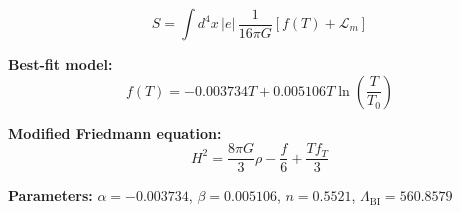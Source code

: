 
\begin{equation}
  S = \int d^4x \, |e| \, \frac{1}{16\pi G} \left[ f(T) + \mathcal{L}_m \right]
\end{equation}

\textbf{Best-fit model:}
\begin{equation}
  f(T) = -0.003734 T + 0.005106 T \ln\!\left(\frac{T}{T_0}\right)
\end{equation}

\textbf{Modified Friedmann equation:}
\begin{equation}
  H^2 = \frac{8\pi G}{3} \rho - \frac{f}{6} + \frac{T f_T}{3}
\end{equation}

\textbf{Parameters:}
$\alpha = -0.003734$, \quad
$\beta = 0.005106$, \quad
$n = 0.5521$, \quad
$\Lambda_{\text{BI}} = 560.8579$